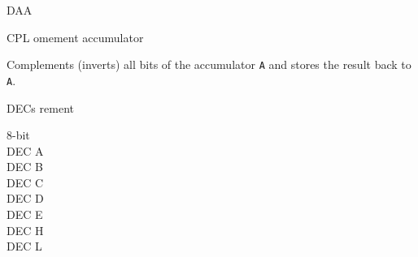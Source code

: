 \begin{basedescript}{
	\desclabelstyle{\multilinelabel}
	\desclabelwidth{3cm}}
\begin{DetailItem}{DAA}{}
	\end{DetailItem}

	\pagebreak


	\begin{DetailItem}{CPL}{}
		{omement accumulator}
		{\SymCPL}

		Complements (inverts) all bits of the accumulator {\tt A} and stores the result back to {\tt A}.

		\begin{DetailEffects}
			\FlagsCPL
		\end{DetailEffects}
		
		\begin{DetailTiming}
		\end{DetailTiming}

	\end{DetailItem}


	\begin{DetailItem}{DEC}{s}
		{rement}
		{}

		\begin{DetailVariants}
			\textnormal{8-bit}\\
			DEC A\\
			DEC B\\
			DEC C\\
			DEC D\\
			DEC E\\
			DEC H\\
			DEC L


\end{DetailVariants}
\end{DetailItem}
\end{basedescript}

